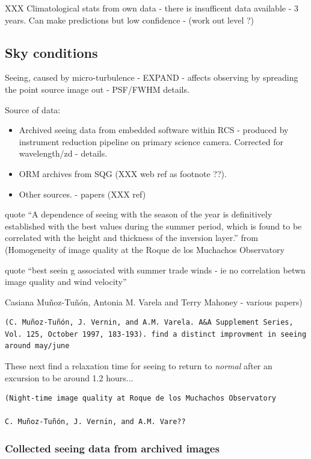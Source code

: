 XXX Climatological stats from own data - there is insufficent data available - 3 years. Can make predictions but low confidence - (work out level ?) 


\subsection{Sky conditions}

Seeing, caused by micro-turbulence - EXPAND - affects observing by spreading the point source image out - PSF/FWHM details. 

Source of data:
\begin{itemize}
\item Archived seeing data from embedded software within RCS - produced by instrument reduction pipeline on primary science camera. Corrected for wavelength/zd - details. 
\item ORM archives from SQG (XXX web ref as footnote ??).
\item Other sources. - papers (XXX ref)
\end{itemize}

quote ``A dependence of seeing with the season of the year is definitively established with the best values during the summer period, which is found to be correlated with the height and thickness of the inversion layer.'' from (Homogeneity of image quality at the Roque de los Muchachos Observatory

quote ``best seein g associated with summer trade winds - ie no correlation betwn image quality and wind velocity''

Casiana Muñoz-Tuñón, Antonia M. Varela and Terry Mahoney - various papers)

\begin{verbatim}(C. Muñoz-Tuñón, J. Vernin, and A.M. Varela. A&A Supplement Series, Vol. 125, October 1997, 183-193). find a distinct improvment in seeing around may/june
\end{verbatim}


These next find a relaxation time for seeing to return to \emph{normal} after an excursion to be around 1.2 hours...
\begin{verbatim}(Night-time image quality at Roque de los Muchachos Observatory

C. Muñoz-Tuñón, J. Vernin, and A.M. Vare??
\end{verbatim}


\subsubsection{Collected seeing data from archived images}

